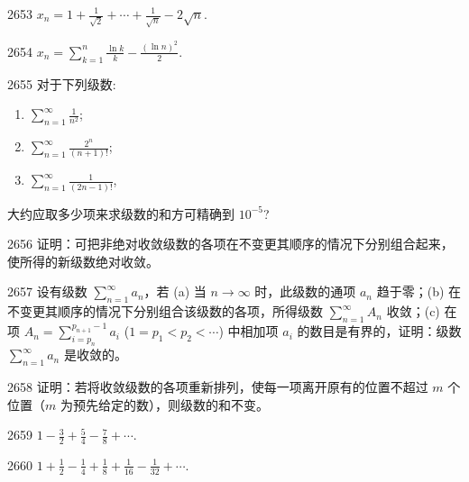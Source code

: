 
\begin{prob}[S]{2653}
$x_n = 1 + \frac{1}{\sqrt{2}} + \cdots + \frac{1}{\sqrt{n}} - 2\sqrt{n}$.
\end{prob}

\begin{prob}[S]{2654}
$x_n = \sum_{k=1}^n \frac{\ln k}{k} - \frac{(\ln n)^2}{2}$.
\end{prob}

\begin{prob}[L]{2655}
对于下列级数:
\begin{enumerate}[label=(\alph*), itemsep=2pt, topsep=3pt]
\item $\sum_{n=1}^{\infty} \frac{1}{n^2}$;
\item $\sum_{n=1}^{\infty} \frac{2^n}{(n+1)!}$;
\item $\sum_{n=1}^{\infty} \frac{1}{(2n-1)!}$,
\end{enumerate}
大约应取多少项来求级数的和方可精确到 $10^{-5}$?
\end{prob}


\begin{prob}[M]{2656}
证明：可把非绝对收敛级数的各项在不变更其顺序的情况下分别组合起来，使所得的新级数绝对收敛。
\end{prob}

\begin{prob}[M]{2657}
设有级数 $\sum_{n=1}^{\infty} a_n$，若 (a) 当 $n \to \infty$ 时，此级数的通项 $a_n$ 趋于零；(b) 在不变更其顺序的情况下分别组合该级数的各项，所得级数 $\sum_{n=1}^{\infty} A_n$ 收敛；(c) 在项 $A_n = \sum_{i=p_n}^{p_{n+1}-1} a_i$ ($1 = p_1 < p_2 < \cdots$) 中相加项 $a_i$ 的数目是有界的，证明：级数 $\sum_{n=1}^{\infty} a_n$ 是收敛的。
\end{prob}

\begin{prob}[M]{2658}
证明：若将收敛级数的各项重新排列，使每一项离开原有的位置不超过 $m$ 个位置（$m$ 为预先给定的数），则级数的和不变。
\end{prob}


\begin{prob}[S]{2659}
$1 - \frac{3}{2} + \frac{5}{4} - \frac{7}{8} + \cdots$.
\end{prob}

\begin{prob}[S]{2660}
$1 + \frac{1}{2} - \frac{1}{4} + \frac{1}{8} + \frac{1}{16} - \frac{1}{32} + \cdots$.
\end{prob}

